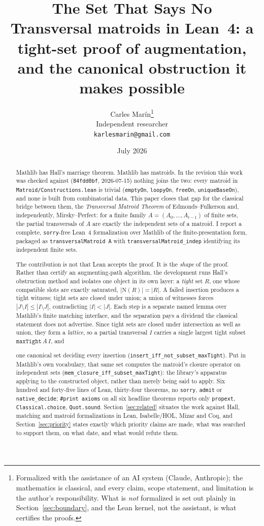 \documentclass[11pt]{article}
\title{\bf The Set That Says No\\[4pt]
  \large\normalfont Transversal matroids in Lean~4: a tight-set proof of augmentation,
  and the canonical obstruction it makes possible}
\author{Carles Mar\'in\thanks{Formalized with the assistance of an AI system (Claude,
Anthropic); the mathematics is classical, and every claim, scope statement, and limitation is
the author's responsibility. What is \emph{not} formalized is set out plainly in
Section~\ref{sec:boundary}, and the Lean kernel, not the assistant, is what certifies the
proofs.}\\[3pt]
  \normalsize Independent researcher\\
  \normalsize \texttt{karlesmarin@gmail.com}}
\date{July 2026}
\newcommand{\lean}[1]{\texttt{#1}}
\newcommand{\N}{\mathrm{N}}
\newcommand{\keyeq}[1]{\begin{center}\keybox{$\displaystyle #1$}\end{center}}
\begin{document}
\maketitle

\begin{abstract}
Mathlib has Hall's marriage theorem. Mathlib has matroids. In the revision this work was
checked against (\lean{84fdd0bf}, 2026-07-15) nothing joins the two: every matroid in
\lean{Matroid/Constructions.lean} is trivial (\lean{emptyOn}, \lean{loopyOn}, \lean{freeOn},
\lean{uniqueBaseOn}), and none is built from combinatorial data. This
paper closes that gap for the classical bridge between them, the \emph{Transversal Matroid
Theorem} of Edmonds--Fulkerson and, independently, Mirsky--Perfect: for a finite family
$A=(A_0,\dots,A_{t-1})$ of finite sets, the partial transversals of $A$ are exactly the
independent sets of a matroid. I report a complete, \lean{sorry}-free Lean~4 formalization
over Mathlib of the finite-presentation form, packaged as \lean{transversalMatroid A} with
\lean{transversalMatroid\_indep} identifying its independent finite sets.

The contribution is not that Lean accepts the proof. It is the \emph{shape} of the proof. Rather
than certify an augmenting-path algorithm, the development runs Hall's obstruction method and
isolates one object in its own layer: a \emph{tight} set $R$, one whose compatible slots are
exactly saturated, $|\N(R)|=|R|$. A failed insertion produces a tight witness; tight sets are
closed under union; a union of witnesses forces $|J\setminus I|\le|I\setminus J|$, contradicting
$|I|<|J|$. Each step is a separate named lemma over Mathlib's finite matching interface, and
the separation pays a dividend the classical statement does not advertise. Since tight sets are
closed under intersection as well as union, they form a \emph{lattice}, so a partial transversal
$I$ carries a single largest tight subset $\lean{maxTight}\,A\,I$, and
\keyeq{\lean{insert}\;e\;I \text{ is a partial transversal} \iff \N(e)\not\subseteq \N(\lean{maxTight}\,A\,I),}
one canonical set deciding every insertion (\lean{insert\_iff\_not\_subset\_maxTight}). Put in
Mathlib's own vocabulary, that same set computes the matroid's closure operator on independent sets
(\lean{mem\_closure\_iff\_subset\_maxTight}): the library's apparatus applying to the constructed
object, rather than merely being said to apply. Six hundred and forty-five lines of Lean,
thirty-four theorems, no \lean{sorry}, \lean{admit} or
\lean{native\_decide}; \lean{\#print axioms} on all six headline theorems reports only
\lean{propext}, \lean{Classical.choice}, \lean{Quot.sound}. Section~\ref{sec:related} situates
the work against Hall, matching and matroid formalizations in Lean, Isabelle/HOL, Mizar and Coq,
and Section~\ref{sec:priority} states exactly which priority claims are made, what was searched to
support them, on what date, and what would refute them.
\end{abstract}
\end{document}
